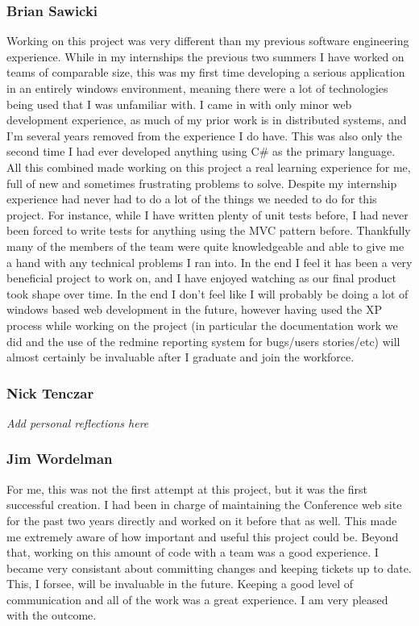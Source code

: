 \documentclass[12pt]{article}
\begin{document}
\subsubsection{Brian Sawicki}
Working on this project was very different than my previous software engineering experience.  While in my internships the previous two summers I have worked on teams of comparable size, this was my first time developing a serious application in an entirely windows environment, meaning there were a lot of technologies being used that I was unfamiliar with.  I came in with only minor web development experience, as much of my prior work is in distributed systems, and I'm several years removed from the experience I do have.  This was also only the second time I had ever developed anything using C\# as the primary language.  All this combined made working on this project a real learning experience for me, full of new and sometimes frustrating problems to solve.  Despite my internship experience had never had to do a lot of the things we needed to do for this project.  For instance, while I have written plenty of unit tests before, I had never been forced to write tests for anything using the MVC pattern before.  Thankfully many of the members of the team were quite knowledgeable and able to give me a hand with any technical problems I ran into.  In the end I feel it has been a very beneficial project to work on, and I have enjoyed watching as our final product took shape over time. In the end I don't feel like I will probably be doing a lot of windows based web development in the future, however having used the XP process while working on the project (in particular the documentation work we did and the use of the redmine reporting system for bugs/users stories/etc) will almost certainly be invaluable after I graduate and join the workforce.
\subsubsection{Nick Tenczar}
\textit{Add personal reflections here}
\subsubsection{Jim Wordelman}
For me, this was not the first attempt at this project, but it was the first
successful creation. I had been in charge of maintaining the Conference web site
for the past two years directly and worked on it before that as well. This made
me extremely aware of how important and useful this project could be. Beyond
that, working on this amount of code with a team was a good experience. I became
very consistant about committing changes and keeping tickets up to date. This, I
forsee, will be invaluable in the future. Keeping a good level of communication
and all of the work was a great experience. I am very pleased with the outcome.
\newpage
\end{document}
